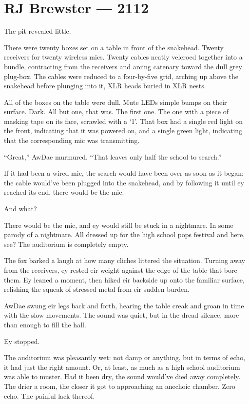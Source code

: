 \hypertarget{rj-brewster-2112}{%
\chapter*{RJ Brewster — 2112}\label{rj-brewster-2112}}

The pit revealed little.

There were twenty boxes set on a table in front of the snakehead. Twenty receivers for twenty wireless mics. Twenty cables neatly velcroed together into a bundle, contracting from the receivers and arcing catenary toward the dull grey plug-box. The cables were reduced to a four-by-five grid, arching up above the snakehead before plunging into it, XLR heads buried in XLR nests.

All of the boxes on the table were dull. Mute LEDs simple bumps on their surface. Dark. All but one, that was. The first one. The one with a piece of masking tape on its face, scrawled with a `1'. That box had a single red light on the front, indicating that it was powered on, and a single green light, indicating that the corresponding mic was transmitting.

``Great,'' AwDae murmured. ``That leaves only half the school to search.''

If it had been a wired mic, the search would have been over as soon as it began: the cable would've been plugged into the snakehead, and by following it until ey reached its end, there would be the mic.

And what?

There would be the mic, and ey would still be stuck in a nightmare. In some parody of a nightmare. All dressed up for the high school pops festival and here, see? The auditorium is completely empty.

The fox barked a laugh at how many cliches littered the situation. Turning away from the receivers, ey rested eir weight against the edge of the table that bore them. Ey leaned a moment, then hiked eir backside up onto the familiar surface, relishing the squeak of stressed metal from eir sudden burden.

AwDae swung eir legs back and forth, hearing the table creak and groan in time with the slow movements. The sound was quiet, but in the dread silence, more than enough to fill the hall.

Ey stopped.

The auditorium was pleasantly wet: not damp or anything, but in terms of echo, it had just the right amount. Or, at least, as much as a high school auditorium was able to muster. Had it been dry, the sound would've died away completely. The drier a room, the closer it got to approaching an anechoic chamber. Zero echo. The painful lack thereof.

